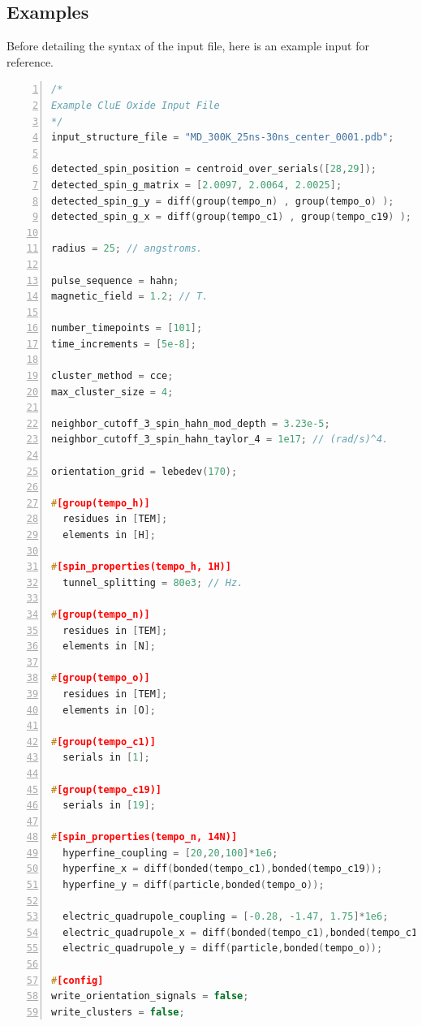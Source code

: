 \documentclass{book}
\begin{document}
\subsection{Examples}
Before detailing the syntax of the input file, here is an example input for
reference.
\begin{lstlisting}[frame=single,numbers=left,language=c]
/*
Example CluE Oxide Input File
*/
input_structure_file = "MD_300K_25ns-30ns_center_0001.pdb";

detected_spin_position = centroid_over_serials([28,29]);
detected_spin_g_matrix = [2.0097, 2.0064, 2.0025];
detected_spin_g_y = diff(group(tempo_n) , group(tempo_o) );
detected_spin_g_x = diff(group(tempo_c1) , group(tempo_c19) );

radius = 25; // angstroms.

pulse_sequence = hahn;
magnetic_field = 1.2; // T.

number_timepoints = [101];
time_increments = [5e-8];

cluster_method = cce;
max_cluster_size = 4;

neighbor_cutoff_3_spin_hahn_mod_depth = 3.23e-5; 
neighbor_cutoff_3_spin_hahn_taylor_4 = 1e17; // (rad/s)^4.

orientation_grid = lebedev(170);

#[group(tempo_h)]
  residues in [TEM];
  elements in [H];

#[spin_properties(tempo_h, 1H)]
  tunnel_splitting = 80e3; // Hz.

#[group(tempo_n)]
  residues in [TEM];
  elements in [N];

#[group(tempo_o)]
  residues in [TEM];
  elements in [O];

#[group(tempo_c1)]
  serials in [1];

#[group(tempo_c19)]
  serials in [19];
  
#[spin_properties(tempo_n, 14N)]
  hyperfine_coupling = [20,20,100]*1e6;
  hyperfine_x = diff(bonded(tempo_c1),bonded(tempo_c19));
  hyperfine_y = diff(particle,bonded(tempo_o));

  electric_quadrupole_coupling = [-0.28, -1.47, 1.75]*1e6;
  electric_quadrupole_x = diff(bonded(tempo_c1),bonded(tempo_c19));
  electric_quadrupole_y = diff(particle,bonded(tempo_o));

#[config]
write_orientation_signals = false;
write_clusters = false;
\end{lstlisting}
\end{document}
